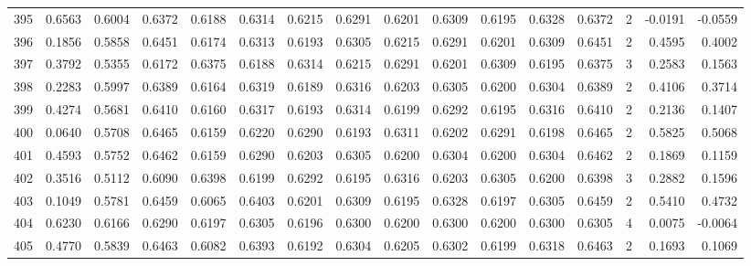 \begin{tabular}{lrrrrrrrrrrrrrrr}
395 &      0.6563 &  0.6004 &  0.6372 &  0.6188 &  0.6314 &  0.6215 &  0.6291 &  0.6201 &  0.6309 &  0.6195 &   0.6328 &     0.6372 &      2 &                   -0.0191 &                    -0.0559 \\
396 &      0.1856 &  0.5858 &  0.6451 &  0.6174 &  0.6313 &  0.6193 &  0.6305 &  0.6215 &  0.6291 &  0.6201 &   0.6309 &     0.6451 &      2 &                    0.4595 &                     0.4002 \\
397 &      0.3792 &  0.5355 &  0.6172 &  0.6375 &  0.6188 &  0.6314 &  0.6215 &  0.6291 &  0.6201 &  0.6309 &   0.6195 &     0.6375 &      3 &                    0.2583 &                     0.1563 \\
398 &      0.2283 &  0.5997 &  0.6389 &  0.6164 &  0.6319 &  0.6189 &  0.6316 &  0.6203 &  0.6305 &  0.6200 &   0.6304 &     0.6389 &      2 &                    0.4106 &                     0.3714 \\
399 &      0.4274 &  0.5681 &  0.6410 &  0.6160 &  0.6317 &  0.6193 &  0.6314 &  0.6199 &  0.6292 &  0.6195 &   0.6316 &     0.6410 &      2 &                    0.2136 &                     0.1407 \\
400 &      0.0640 &  0.5708 &  0.6465 &  0.6159 &  0.6220 &  0.6290 &  0.6193 &  0.6311 &  0.6202 &  0.6291 &   0.6198 &     0.6465 &      2 &                    0.5825 &                     0.5068 \\
401 &      0.4593 &  0.5752 &  0.6462 &  0.6159 &  0.6290 &  0.6203 &  0.6305 &  0.6200 &  0.6304 &  0.6200 &   0.6304 &     0.6462 &      2 &                    0.1869 &                     0.1159 \\
402 &      0.3516 &  0.5112 &  0.6090 &  0.6398 &  0.6199 &  0.6292 &  0.6195 &  0.6316 &  0.6203 &  0.6305 &   0.6200 &     0.6398 &      3 &                    0.2882 &                     0.1596 \\
403 &      0.1049 &  0.5781 &  0.6459 &  0.6065 &  0.6403 &  0.6201 &  0.6309 &  0.6195 &  0.6328 &  0.6197 &   0.6305 &     0.6459 &      2 &                    0.5410 &                     0.4732 \\
404 &      0.6230 &  0.6166 &  0.6290 &  0.6197 &  0.6305 &  0.6196 &  0.6300 &  0.6200 &  0.6300 &  0.6200 &   0.6300 &     0.6305 &      4 &                    0.0075 &                    -0.0064 \\
405 &      0.4770 &  0.5839 &  0.6463 &  0.6082 &  0.6393 &  0.6192 &  0.6304 &  0.6205 &  0.6302 &  0.6199 &   0.6318 &     0.6463 &      2 &                    0.1693 &                     0.1069 \\

\end{tabular}
